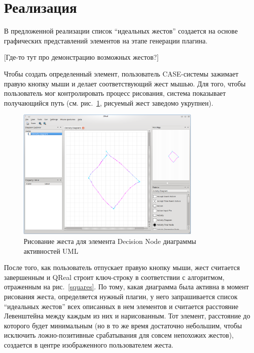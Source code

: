 \documentclass[a5paper]{article}
\begin{document}
\section{Реализация}

В предложенной реализации список ``идеальных жестов'' создается на основе графических представлений элементов на этапе генерации плагина.

[Где-то тут про демонстрацию возможных жестов?]

Чтобы создать определенный элемент, пользователь CASE-системы зажимает правую кнопку мыши и делает соответствующий жест мышью. 
Для того, чтобы пользователь мог контролировать процесс рисования, система показывает получающийся путь (см. рис.~\ref{drawing}, 
рисуемый жест заведомо укрупнен).

\begin{figure} [ht]
  \begin{center}
    \includegraphics[width=0.8\textwidth, bb=0 0 800 600]{05-drawing.png}
    \caption{Рисование жеста для элемента Decision Node диаграммы активностей UML}
    \label{drawing}
  \end{center}
\end{figure}

После того, как пользователь отпускает правую кнопку мыши, жест считается завершенным и QReal строит ключ-строку в соответствии с алгоритмом,
отраженным на рис.~\ref{squares}. По тому, какая диаграмма была активна в момент рисования жеста, определяется нужный плагин, у него 
запрашивается список ``идеальных жестов'' всех описанных в нем элементов и считается расстояние Левенштейна между каждым из них и нарисованным. 
Тот элемент, расстояние до которого будет минимальным (но в то же время достаточно небольшим, чтобы исключить ложно-позитивные срабатывания 
для совсем непохожих жестов), создается в центре изображенного пользователем жеста. 
\end{document}
